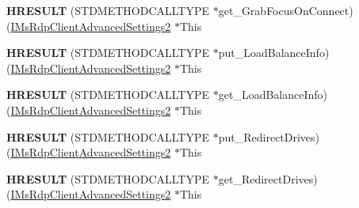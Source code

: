 \begin{DoxyCompactItemize}
\item 
\mbox{\label{struct_m_s_t_s_c_lib_1_1_i_ms_rdp_client_advanced_settings2_vtbl_a6d63dbee9bd5c8c6306f3f060acd89c0}} 
{\bfseries H\+R\+E\+S\+U\+LT} (S\+T\+D\+M\+E\+T\+H\+O\+D\+C\+A\+L\+L\+T\+Y\+PE $\ast$get\+\_\+\+Grab\+Focus\+On\+Connect)(\hyperlink{interface_m_s_t_s_c_lib_1_1_i_ms_rdp_client_advanced_settings2}{I\+Ms\+Rdp\+Client\+Advanced\+Settings2} $\ast$This
\item 
\mbox{\label{struct_m_s_t_s_c_lib_1_1_i_ms_rdp_client_advanced_settings2_vtbl_a7e6507939a79885b0b4d1e0586a857c7}} 
{\bfseries H\+R\+E\+S\+U\+LT} (S\+T\+D\+M\+E\+T\+H\+O\+D\+C\+A\+L\+L\+T\+Y\+PE $\ast$put\+\_\+\+Load\+Balance\+Info)(\hyperlink{interface_m_s_t_s_c_lib_1_1_i_ms_rdp_client_advanced_settings2}{I\+Ms\+Rdp\+Client\+Advanced\+Settings2} $\ast$This
\item 
\mbox{\label{struct_m_s_t_s_c_lib_1_1_i_ms_rdp_client_advanced_settings2_vtbl_a21dd1636c5329689f8465277cfdb2a58}} 
{\bfseries H\+R\+E\+S\+U\+LT} (S\+T\+D\+M\+E\+T\+H\+O\+D\+C\+A\+L\+L\+T\+Y\+PE $\ast$get\+\_\+\+Load\+Balance\+Info)(\hyperlink{interface_m_s_t_s_c_lib_1_1_i_ms_rdp_client_advanced_settings2}{I\+Ms\+Rdp\+Client\+Advanced\+Settings2} $\ast$This
\item 
\mbox{\label{struct_m_s_t_s_c_lib_1_1_i_ms_rdp_client_advanced_settings2_vtbl_a54d94494415d2fef3c3928454aa17a92}} 
{\bfseries H\+R\+E\+S\+U\+LT} (S\+T\+D\+M\+E\+T\+H\+O\+D\+C\+A\+L\+L\+T\+Y\+PE $\ast$put\+\_\+\+Redirect\+Drives)(\hyperlink{interface_m_s_t_s_c_lib_1_1_i_ms_rdp_client_advanced_settings2}{I\+Ms\+Rdp\+Client\+Advanced\+Settings2} $\ast$This
\item 
\mbox{\label{struct_m_s_t_s_c_lib_1_1_i_ms_rdp_client_advanced_settings2_vtbl_ad06d8335859509c040770f3909336733}} 
{\bfseries H\+R\+E\+S\+U\+LT} (S\+T\+D\+M\+E\+T\+H\+O\+D\+C\+A\+L\+L\+T\+Y\+PE $\ast$get\+\_\+\+Redirect\+Drives)(\hyperlink{interface_m_s_t_s_c_lib_1_1_i_ms_rdp_client_advanced_settings2}{I\+Ms\+Rdp\+Client\+Advanced\+Settings2} $\ast$This
\item 

\end{DoxyCompactItemize}
